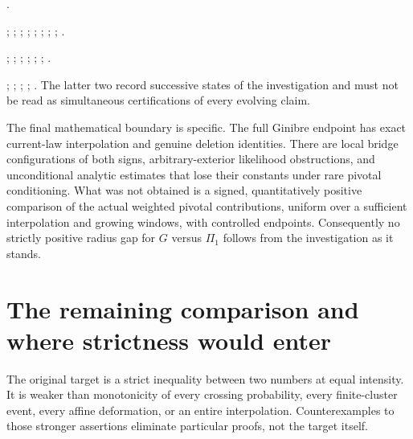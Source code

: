 \documentclass[11pt,a4paper]{article}
\theoremstyle{definition}
\theoremstyle{remark}
\numberwithin{equation}{section}
\begin{document}
\begin{description}
.
\item[Omitted points and Gram optimization.]
;
;
;
;
;
;
;
;
.
\item[Conditional kernels and genuine coupling.]
;
;
;
;
;
;
.
\item[Limits, constants, and chronology.]
;
;
;
;
.  The latter two record successive
states of the investigation and must not be read as simultaneous
certifications of every evolving claim.
\end{description}

The final mathematical boundary is specific.  The full Ginibre endpoint
has exact current-law interpolation and genuine deletion identities.
There are local bridge configurations of both signs, arbitrary-exterior
likelihood obstructions, and unconditional analytic estimates that lose
their constants under rare pivotal conditioning.  What was not obtained
is a signed, quantitatively positive comparison of the actual weighted
pivotal contributions, uniform over a sufficient interpolation and
growing windows, with controlled endpoints.  Consequently no strictly
positive radius gap for $G$ versus $\Pi_1$ follows from the investigation
as it stands.


\section{The remaining comparison and where strictness would enter}
\label{sec:remaining}

The original target is a strict inequality between two numbers at equal
intensity. It is weaker than monotonicity of every crossing probability,
every finite-cluster event, every affine deformation, or an entire
interpolation. Counterexamples to those stronger assertions eliminate
particular proofs, not the target itself.
\end{document}
